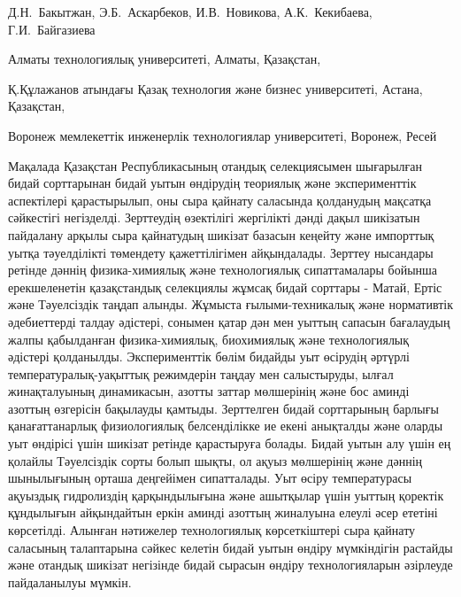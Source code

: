 
\begin{header}

Д.Н.~Бакытжан\envelope,
Э.Б.~Аскарбеков,
И.В.~Новикова,
А.К.~Кекибаева,
Г.И.~Байгазиева
\end{header}

\begin{affil}
Алматы технологиялық университеті, Алматы, Қазақстан,

Қ.Құлажанов атындағы Қазақ технология және бизнес университеті, Астана, Қазақстан,

Воронеж мемлекеттік инженерлік технологиялар университеті, Воронеж, Ресей

\end{affil}

Мақалада Қазақстан Республикасының отандық селекциясымен шығарылған
бидай сорттарынан бидай уытын өндірудің теориялық және эксперименттік
аспектілері қарастырылып, оны сыра қайнату саласында қолданудың мақсатқа
сәйкестігі негізделді. Зерттеудің өзектілігі жергілікті дәнді дақыл
шикізатын пайдалану арқылы сыра қайнатудың шикізат базасын кеңейту және
импорттық уытқа тәуелділікті төмендету қажеттілігімен айқындалады.
Зерттеу нысандары ретінде дәннің физика-химиялық және технологиялық
сипаттамалары бойынша ерекшеленетін қазақстандық селекциялы жұмсақ бидай
сорттары - Матай, Ертіс және Тәуелсіздік таңдап алынды. Жұмыста
ғылыми-техникалық және нормативтік әдебиеттерді талдау әдістері, сонымен
қатар дән мен уыттың сапасын бағалаудың жалпы қабылданған
физика-химиялық, биохимиялық және технологиялық әдістері қолданылды.
Эксперименттік бөлім бидайды уыт өсірудің әртүрлі
температуралық-уақыттық режимдерін таңдау мен салыстыруды, ылғал
жинақталуының динамикасын, азотты зат\-тар мөлшерінің және бос аминді
азоттың өзгерісін бақылауды қамтыды. Зерттелген бидай сорттарының
барлығы қанағаттанарлық физиологиялық белсенділікке ие екені анықталды
және оларды уыт өндірісі үшін шикізат ретінде қарастыруға болады. Бидай
уытын алу үшін ең қолайлы Тәуелсіздік сорты болып шықты, ол ақуыз
мөлшерінің және дәннің шынылығының орташа деңгейімен сипатталады. Уыт
өсіру температурасы ақуыздық гидролиздің қарқындылығына және ашытқылар
үшін уыттың қоректік құндылығын айқындайтын еркін аминді азоттың
жиналуына елеулі әсер ететіні көрсетілді. Алынған нәтижелер
технологиялық көрсеткіштері сыра қайнату саласының талаптарына сәйкес
келетін бидай уытын өндіру мүмкіндігін растайды және отандық шикізат
негізінде бидай сырасын өндіру технологияларын әзірлеуде пайдаланылуы
мүмкін.

